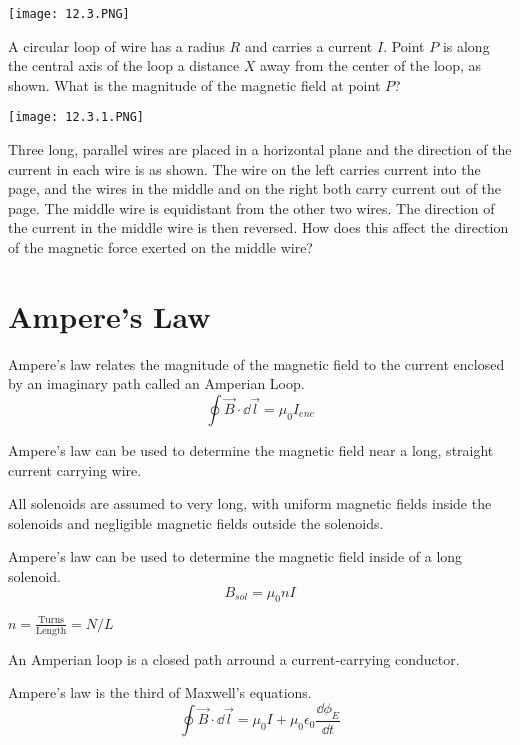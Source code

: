 \documentclass[../em.tex]{subfiles}
\begin{document}
\ex \begin{center}
    \texttt{[image: 12.3.PNG]}
\end{center}
A circular loop of wire has a radius $R$ and carries a current $I$. Point $P$ is along the central axis of the loop a distance $X$ away from the center of the loop, as shown. What is the magnitude of the magnetic field at point $P$?

\ex \begin{center}
    \texttt{[image: 12.3.1.PNG]}
\end{center}
Three long, parallel wires are placed in a horizontal plane and the direction of the current in each wire is as shown. The wire on the left carries current into the page, and the wires in the middle and on the right both carry current 
out of the page. The middle wire is equidistant from the other two wires. The direction of the current in the middle wire is then reversed. How does this affect the direction of the magnetic force exerted on the middle wire?

\section{Ampere's Law}
Ampere's law relates the magnitude of the magnetic field to the current enclosed by an imaginary path called an Amperian Loop.
\[\oint \vec{B}\cdot \dd \vec{l} = \mu_0 I_{enc} \]

Ampere's law can be used to determine the magnetic field near a long, straight current carrying wire.

All solenoids are assumed to very long, with uniform magnetic fields inside the solenoids and negligible magnetic fields outside the solenoids.

Ampere's law can be used to determine the magnetic field inside of a long solenoid.
\[ B_{sol} = \mu_0 nI\]

$n = \frac{\text{Turns}}{\text{Length}} = N/L$

An Amperian loop is a closed path arround a current-carrying conductor.

Ampere's law is the third of Maxwell's equations.
\[ \oint \vec{B} \cdot \dd \vec{l} = \mu_0 I + \mu_0 \epsilon_0 \frac{\dd\phi_E}{\dd t}\]
\end{document}
